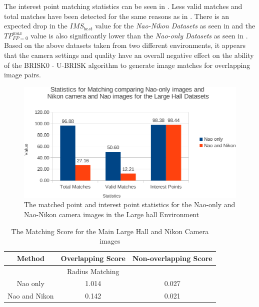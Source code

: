 The interest point matching statistics can be seen in . Less valid matches and total matches have been detected for the same reasons as in . There is an expected drop in the $IMS_{best}$ value for the \textit{Nao-Nikon Datasets} as seen in  and the $TP_{FP=0}^{max}$ value is also significantly lower than the \textit{Nao-only Datasets} as seen in .\\

Based on the above datasets taken from two different environments, it appears that the camera settings and quality have an overall negative effect on the ability of the BRISK0 - U-BRISK algorithm to generate image matches for overlapping image pairs.\\

\begin{figure}[h!] 
  \centering
    \includegraphics[width=1.0\textwidth]{../Drawings/Graphs/nikon_lh_matches_keypoints_best.pdf}
    \caption{The matched point and interest point statistics for the Nao-only and Nao-Nikon camera images in the Large hall Environment}
    \label{fig:nikon_lh_matches_keypoints}
\end{figure}


\begin{table}
\centering
\caption{The Matching Score for the Main Large Hall and Nikon Camera images}
\begin{tabular}{|c|c|c|}
\hline 
Method & Overlapping Score & Non-overlapping Score\tabularnewline
\hline 
\hline 
 & Radius Matching & \tabularnewline
\hline 
Nao only & 1.014 & 0.027\tabularnewline
\hline 
Nao and Nikon & 0.142 & 0.021\tabularnewline
\hline 
\end{tabular}
\label{tab:ms_nikon_lh}
\end{table}

